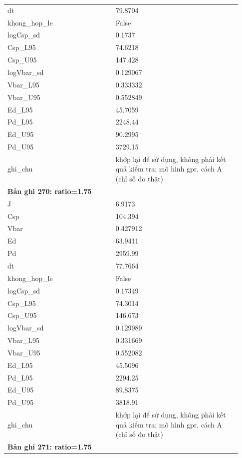 \begin{longtable}{p{0.43\linewidth}p{0.50\linewidth}}
dt & 79.8704 \\
khong\_\allowbreak hop\_\allowbreak le & False \\
logCsp\_\allowbreak sd & 0.1737 \\
Csp\_\allowbreak L95 & 74.6218 \\
Csp\_\allowbreak U95 & 147.428 \\
logVbar\_\allowbreak sd & 0.129067 \\
Vbar\_\allowbreak L95 & 0.333332 \\
Vbar\_\allowbreak U95 & 0.552849 \\
Ed\_\allowbreak L95 & 45.7059 \\
Pd\_\allowbreak L95 & 2248.44 \\
Ed\_\allowbreak U95 & 90.2995 \\
Pd\_\allowbreak U95 & 3729.15 \\
ghi\_\allowbreak chu & khớp lại để sử dụng, không phải kết quả kiểm tra; mô hình gpr, cách A (chỉ số đo thật) \\
\midrule
\multicolumn{2}{p{0.95\linewidth}}{\textbf{Bản ghi 270: ratio=1.75}} \\
J & 6.9173 \\
Csp & 104.394 \\
Vbar & 0.427912 \\
Ed & 63.9411 \\
Pd & 2959.99 \\
dt & 77.7664 \\
khong\_\allowbreak hop\_\allowbreak le & False \\
logCsp\_\allowbreak sd & 0.17349 \\
Csp\_\allowbreak L95 & 74.3014 \\
Csp\_\allowbreak U95 & 146.673 \\
logVbar\_\allowbreak sd & 0.129989 \\
Vbar\_\allowbreak L95 & 0.331669 \\
Vbar\_\allowbreak U95 & 0.552082 \\
Ed\_\allowbreak L95 & 45.5096 \\
Pd\_\allowbreak L95 & 2294.25 \\
Ed\_\allowbreak U95 & 89.8375 \\
Pd\_\allowbreak U95 & 3818.91 \\
ghi\_\allowbreak chu & khớp lại để sử dụng, không phải kết quả kiểm tra; mô hình gpr, cách A (chỉ số đo thật) \\
\midrule
\multicolumn{2}{p{0.95\linewidth}}{\textbf{Bản ghi 271: ratio=1.75}} \\

\end{longtable}
